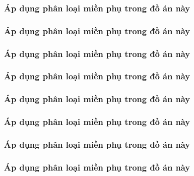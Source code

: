 









\subsubsection{Áp dụng phân loại miền phụ trong đồ án này}

\subsubsection{Áp dụng phân loại miền phụ trong đồ án này}

\subsubsection{Áp dụng phân loại miền phụ trong đồ án này}

\subsubsection{Áp dụng phân loại miền phụ trong đồ án này}

\subsubsection{Áp dụng phân loại miền phụ trong đồ án này}

\subsubsection{Áp dụng phân loại miền phụ trong đồ án này}

\subsubsection{Áp dụng phân loại miền phụ trong đồ án này}

\subsubsection{Áp dụng phân loại miền phụ trong đồ án này}

